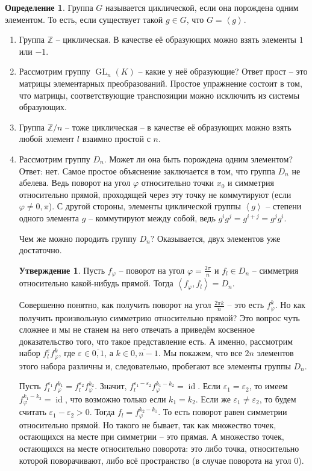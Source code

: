 \documentclass[10pt,a4paper,oneside]{book}
\theoremstyle{definition}
\newtheorem*{defn}{\color{yellow!30!red} Определение}
\newtheorem{utvr}{\color{blue!50!black}Утверждение}
\newcommand{\mb}[1]{\mathbb{#1}}
\newcommand{\ovl}{\overline}
\newcommand{\id}{\operatorname{id}}
\newcommand{\GL}{\operatorname{GL}}
\def\exm{\noindent {\bf Примеры:}}
\def\ffi{\varphi}
\def\eps{\varepsilon}
\def\lan{\left\langle }
\def\ran{\right\rangle}
\def\dfn{\begin{defn}}
\def\edfn{\end{defn}}
\def\enm{\begin{enumerate}}
\def\eenm{\end{enumerate}}
\def\utv{\begin{utvr}}
\def\eutv{\end{utvr}}
\begin{document}
\dfn Группа $G$ называется циклической, если она порождена одним элементом. То есть, если существует такой $g\in G$, что $G=\lan g \ran$.
\edfn

\exm
\enm
\item Группа $\mb Z$ -- циклическая. В качестве её образующих можно взять элементы $1$ или $-1$.
\item Рассмотрим группу $\GL_n(K)$ -- какие у неё образующие? Ответ прост -- это матрицы элементарных преобразований. Простое упражнение состоит в том, что матрицы, соответствующие транспозиции можно исключить из системы образующих.
\item Группа $\mb Z/n$ -- тоже циклическая -- в качестве её образующих можно взять любой элемент $l$ взаимно простой с $n$.
\item Рассмотрим группу $D_n$. Может ли она быть порождена одним элементом? Ответ: нет. Самое простое объяснение заключается в том, что группа $D_n$ не абелева. Ведь поворот на угол $\ffi$ относительно точки $x_0$ и симметрия относительно прямой, проходящей через эту точку не коммутируют (если $\ffi \neq 0, \pi $). С другой стороны, элементы циклической группы $\lan g\ran$ -- степени одного элемента $g$ -- коммутируют между собой, ведь $g^ig^j=g^{i+j}=g^jg^i$.

Чем же можно породить группу $D_n$? Оказывается, двух элементов уже достаточно.

\utv Пусть $f_{\ffi}$ -- поворот на угол   $\ffi=\frac{2\pi}{n}$ и $f_l \in D_n$ -- симметрия относительно какой-нибудь прямой.
Тогда $\lan f_{\ffi},f_l\ran =D_n$.
\eutv
\proof
Совершенно понятно, как получить поворот на угол $\frac{2\pi k}n$ -- это есть $f_{\ffi}^k$. Но как получить произвольную симметрию относительно прямой? Это вопрос чуть сложнее и мы не станем на него отвечать а приведём косвенное доказательство того, что такое представление есть. А именно, рассмотрим набор $f_l^{\eps} f_{\ffi}^k$, где $\eps\in \ovl{0,1}$, а $k\in \ovl{0,n-1}$.  Мы покажем, что все $2n$ элементов этого набора различны и, следовательно, пробегают все элементы группы $D_n$. 

Пусть $f_l^{\eps_1}f_{\ffi}^{k_1}=f_l^{\eps_2}f_{\ffi}^{k_2}$. Значит, $f_l^{\eps_1-\eps_2}f_{\ffi}^{k_1-k_2}=\id$.
Если $\eps_1=\eps_2$, то имеем $f_{\ffi}^{k_1-k_2}=\id$, что возможно только если $k_1=k_2$. Если же $\eps_1\neq \eps_2$, то будем считать $\eps_1-\eps_2>0$. Тогда $f_{l}=f_{\ffi}^{k_2-k_1}$. То есть поворот равен симметрии относительно прямой. Но такого не бывает, так как множество точек, остающихся на месте при симметрии -- это прямая. А множество точек, остающихся на месте относительно поворота: это либо точка, относительно которой поворачивают, либо всё пространство (в случае поворота на угол $0$).
\endproof
\eenm
\end{document}
